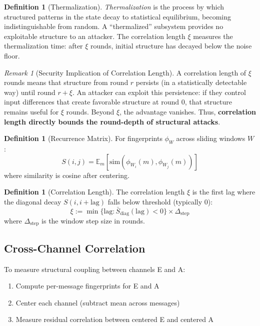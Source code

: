 \documentclass[11pt,a4paper]{article}
\theoremstyle{plain}
\theoremstyle{definition}
\newtheorem{definition}[theorem]{Definition}
\theoremstyle{remark}
\newtheorem{remark}[theorem]{Remark}
\begin{document}
\begin{definition}[Thermalization]
\emph{Thermalization} is the process by which structured patterns in the state decay to statistical equilibrium, becoming indistinguishable from random. A ``thermalized'' subsystem provides no exploitable structure to an attacker. The correlation length $\xi$ measures the thermalization time: after $\xi$ rounds, initial structure has decayed below the noise floor.
\end{definition}

\begin{remark}[Security Implication of Correlation Length]
A correlation length of $\xi$ rounds means that structure from round $r$ persists (in a statistically detectable way) until round $r + \xi$. An attacker can exploit this persistence: if they control input differences that create favorable structure at round 0, that structure remains useful for $\xi$ rounds. Beyond $\xi$, the advantage vanishes. Thus, \textbf{correlation length directly bounds the round-depth of structural attacks}.
\end{remark}

\begin{definition}[Recurrence Matrix]
For fingerprints $\phi_W$ across sliding windows $W$:
\begin{equation}
    S(i,j) = \mathbb{E}_m\left[ \mathrm{sim}(\phi_{W_i}(m), \phi_{W_j}(m)) \right]
\end{equation}
where similarity is cosine after centering.
\end{definition}

\begin{definition}[Correlation Length]
The correlation length $\xi$ is the first lag where the diagonal decay $S(i, i+\text{lag})$ falls below threshold (typically 0):
\begin{equation}
    \xi := \min\{ \text{lag} : \bar{S}_{\text{diag}}(\text{lag}) < 0 \} \times \Delta_{\text{step}}
\end{equation}
where $\Delta_{\text{step}}$ is the window step size in rounds.
\end{definition}

\subsection{Cross-Channel Correlation}

To measure structural coupling between channels E and A:

\begin{enumerate}
    \item Compute per-message fingerprints for E and A
    \item Center each channel (subtract mean across messages)
    \item Measure residual correlation between centered E and centered A
\end{enumerate}
\end{document}
